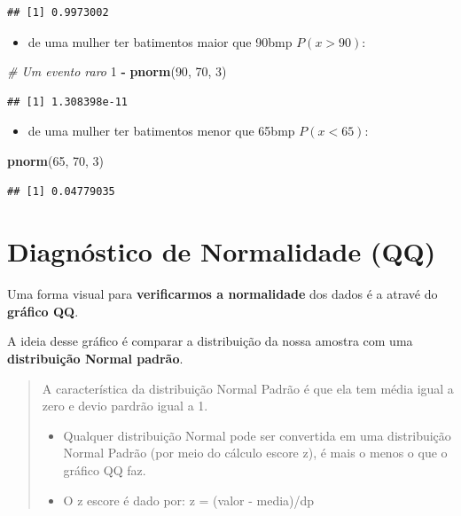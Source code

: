 \documentclass[
]{book}
\newenvironment{Shaded}{\begin{snugshade}}{\end{snugshade}}
\newcommand{\CommentTok}[1]{\textcolor[rgb]{0.56,0.35,0.01}{\textit{#1}}}
\newcommand{\DecValTok}[1]{\textcolor[rgb]{0.00,0.00,0.81}{#1}}
\newcommand{\FunctionTok}[1]{\textcolor[rgb]{0.13,0.29,0.53}{\textbf{#1}}}
\newcommand{\NormalTok}[1]{#1}
\newcommand{\SpecialCharTok}[1]{\textcolor[rgb]{0.81,0.36,0.00}{\textbf{#1}}}
\providecommand{\tightlist}{%
  \setlength{\itemsep}{0pt}\setlength{\parskip}{0pt}}
\begin{document}
\begin{verbatim}
## [1] 0.9973002
\end{verbatim}

\begin{itemize}
\tightlist
\item
  de uma mulher ter batimentos maior que 90bmp \(P(x > 90)\):
\end{itemize}

\begin{Shaded}
\begin{Highlighting}[]
\CommentTok{\# Um evento raro}
\DecValTok{1} \SpecialCharTok{{-}} \FunctionTok{pnorm}\NormalTok{(}\DecValTok{90}\NormalTok{, }\DecValTok{70}\NormalTok{, }\DecValTok{3}\NormalTok{)}
\end{Highlighting}
\end{Shaded}

\begin{verbatim}
## [1] 1.308398e-11
\end{verbatim}

\begin{itemize}
\tightlist
\item
  de uma mulher ter batimentos menor que 65bmp \(P(x < 65)\):
\end{itemize}

\begin{Shaded}
\begin{Highlighting}[]
\FunctionTok{pnorm}\NormalTok{(}\DecValTok{65}\NormalTok{, }\DecValTok{70}\NormalTok{, }\DecValTok{3}\NormalTok{)}
\end{Highlighting}
\end{Shaded}

\begin{verbatim}
## [1] 0.04779035
\end{verbatim}

\section{Diagnóstico de Normalidade (QQ)}\label{diagnuxf3stico-de-normalidade-qq}

Uma forma visual para \textbf{verificarmos a normalidade} dos dados é a atravé do \textbf{gráfico QQ}.

A ideia desse gráfico é comparar a distribuição da nossa amostra com uma \textbf{distribuição Normal padrão}.

\begin{quote}
A característica da distribuição Normal Padrão é que ela tem média igual a zero e devio pardrão igual a 1.

\begin{itemize}
\item
  Qualquer distribuição Normal pode ser convertida em uma distribuição Normal Padrão (por meio do cálculo escore z), é mais o menos o que o gráfico QQ faz.
\item
  O z escore é dado por: z = (valor - media)/dp
\end{itemize}
\end{quote}
\end{document}
